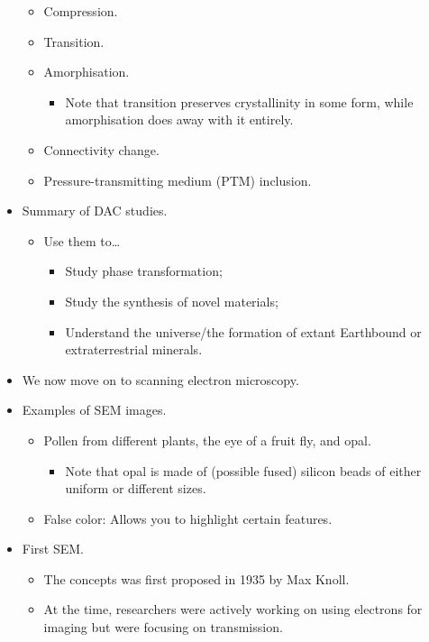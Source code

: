 \documentclass[../notes.tex]{subfiles}
\begin{document}
\begin{itemize}
\begin{itemize}
        \item Compression.
        \item Transition.
        \item Amorphisation.
        \begin{itemize}
            \item Note that transition preserves crystallinity in some form, while amorphisation does away with it entirely.
        \end{itemize}
        \item Connectivity change.
        \item Pressure-transmitting medium (PTM) inclusion.
    \end{itemize}
    \item Summary of DAC studies.
    \begin{itemize}
        \item Use them to\dots
        \begin{itemize}
            \item Study phase transformation;
            \item Study the synthesis of novel materials;
            \item Understand the universe/the formation of extant Earthbound or extraterrestrial minerals.
        \end{itemize}
    \end{itemize}
    \item We now move on to scanning electron microscopy.
    \item Examples of SEM images.
    \begin{itemize}
        \item Pollen from different plants, the eye of a fruit fly, and opal.
        \begin{itemize}
            \item Note that opal is made of (possible fused) silicon beads of either uniform or different sizes.
        \end{itemize}
        \item False color: Allows you to highlight certain features.
    \end{itemize}
    \item First SEM.
    \begin{itemize}
        \item The concepts was first proposed in 1935 by Max Knoll.
        \item At the time, researchers were actively working on using electrons for imaging but were focusing on transmission.

\end{itemize}
\end{itemize}
\end{document}
